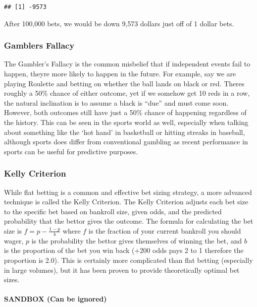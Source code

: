 \documentclass[]{article}
\let\oldparagraph\paragraph
\renewcommand{\paragraph}[1]{\oldparagraph{#1}\mbox{}}
\begin{document}
\begin{verbatim}
## [1] -9573
\end{verbatim}

After 100,000 bets, we would be down 9,573 dollars just off of 1 dollar
bets.

\hypertarget{gamblers-fallacy}{%
\subsubsection{Gamblers Fallacy}\label{gamblers-fallacy}}

The Gambler's Fallacy is the common misbelief that if independent events
fail to happen, theyre more likely to happen in the future. For example,
say we are playing Roulette and betting on whether the ball lands on
black or red. Theres roughly a 50\% chance of either outcome, yet if we
somehow get 10 reds in a row, the natural inclination is to assume a
black is ``due'' and must come soon. However, both outcomes still have
just a 50\% chance of happening regardless of the history. This can be
seen in the sports world as well, especially when talking about
something like the `hot hand' in basketball or hitting streaks in
baseball, although sports does differ from conventional gambling as
recent performance in sports can be useful for predictive purposes.

\hypertarget{kelly-criterion}{%
\subsubsection{Kelly Criterion}\label{kelly-criterion}}

While flat betting is a common and effective bet sizing strategy, a more
advanced technique is called the Kelly Criterion. The Kelly Criterion
adjusts each bet size to the specific bet based on bankroll size, given
odds, and the predicted probability that the bettor gives the outcome.
The formula for calculating the bet size is \(f=p-\frac{1-p}{b}\) where
\(f\) is the fraction of your current bankroll you should wager, \(p\)
is the probability the bettor gives themselves of winning the bet, and
\(b\) is the proportion of the bet you win back (+200 odds pays 2 to 1
therefore the proportion is 2.0). This is certainly more complicated
than flat betting (especially in large volumes), but it has been proven
to provide theoretically optimal bet sizes.

\hypertarget{sandbox-can-be-ignored}{%
\paragraph{SANDBOX (Can be ignored)}\label{sandbox-can-be-ignored}}
\end{document}
